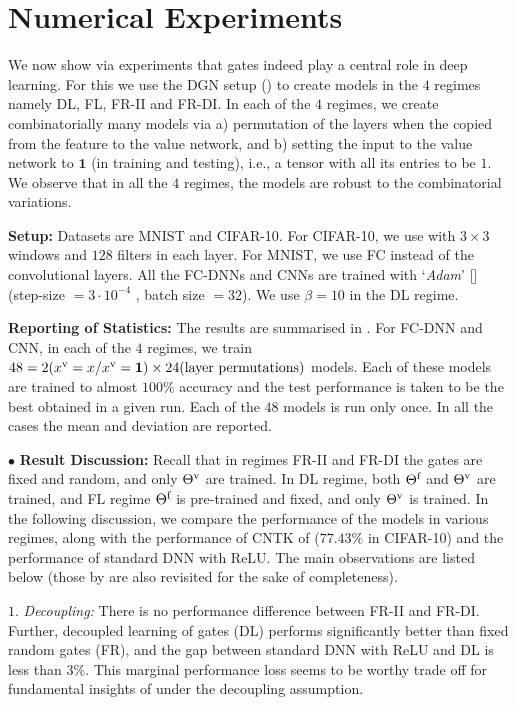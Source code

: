 \section{Numerical Experiments}\label{sec:exp} 
We  now show via experiments that gates indeed play a central role in deep learning. For this we use the DGN setup () to create models in the $4$ regimes namely DL, FL, FR-II and FR-DI. In each of the $4$ regimes, we create  combinatorially many models via a) permutation of the layers when the copied from the feature to the value network, and b) setting the input to the value network to $\mathbf{1}$ (in training and testing), i.e., a tensor with all its entries to be $1$. We observe that in all the $4$ regimes, the models are robust to the combinatorial variations.

\textbf{Setup:} Datasets are MNIST and CIFAR-10. For CIFAR-10, we use  with $3\times 3$  windows and $128$ filters in each layer. For MNIST, we use FC instead of the convolutional layers.  All the FC-DNNs and CNNs are trained with `\emph{Adam}'  [] (step-size $=3\cdot 10^{-4}$ , batch size $=32$). We use $\beta=10$ in the DL regime.

\textbf{Reporting of Statistics:} The results are summarised in . For FC-DNN and CNN, in each of the $4$ regimes, we train $48= 2 (x^{\text{v}}=x / x^{\text{v}}=\mathbf{1}) \times 24(\text{layer permutations})$ models. Each of these models are trained to almost $100\%$ accuracy and the test performance is taken to be the best obtained in a given run. Each of the $48$ models is run only once. In all the cases the mean and deviation are reported.


$\bullet$ \textbf{Result Discussion:}  Recall that in regimes FR-II and FR-DI the gates are fixed and random, and only ${\Theta}^{\text{v}}$ are trained. In DL regime, both $\Theta^{\textrm{f}}$ and ${\Theta}^{\text{v}}$ are trained, and FL regime $\Theta^{\textrm{f}}$ is pre-trained and fixed, and only ${\Theta}^{\text{v}}$ is trained. In the following discussion, we compare the performance of the models in various regimes, along with the performance of CNTK of \cite{arora2019exact} ($77.43\%$ in CIFAR-10) and the performance of standard DNN with ReLU.  The main observations are listed below (those by \cite{ch2020neural} are also revisited for the sake of completeness). 

\indent\quad $1.$ \emph{Decoupling:} There is no performance difference between FR-II and FR-DI.%
Further, decoupled learning of gates (DL) performs significantly better than fixed random gates (FR), and the gap between standard DNN with ReLU and DL is less than $3\%$. This marginal performance loss seems to be worthy trade off for fundamental insights of  under the decoupling assumption.



